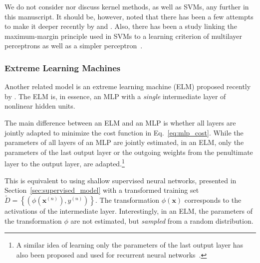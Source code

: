 \documentclass{now}
\newcommand{\vect}[1]{\mathbf{#1}}
\newcommand{\vx}[0]{\vect{x}}
\begin{document}

We do not consider nor discuss kernel methods, as well as SVMs, any further in
this manuscript.  It should be, however, noted that there has been a few
attempts to make it deeper recently by \citet{Cho2009} and \citet{Damianou2012}.
Also, there has been a study linking the maximum-margin principle used in SVMs
to a learning criterion of multilayer perceptrons as well as a simpler
perceptron~\citep[see, e.g.,][]{Collobert2004}.

\subsubsection{Extreme Learning Machines}
\label{sec:elm}

Another related model is an extreme learning machine
(ELM) proposed recently by
\citet{Huang2006}. The ELM is, in essence, an MLP with a \textit{single}
intermediate layer of nonlinear hidden units.

The main difference between an ELM and an MLP is whether all layers are jointly
adapted to minimize the cost function in Eq.~\eqref{eq:mlp_cost}. While the
parameters of all layers of an MLP are jointly estimated, in an ELM, only the
parameters of the last output layer or the outgoing weights from the penultimate
layer to the output layer, are adapted.\footnote{
    A similar idea of learning only the parameters of the last output layer has also
    been proposed and used for recurrent neural networks~\citep[see, e.g.,][]{Jaeger2009}.
}

This is equivalent to using shallow supervised neural networks, presented in
Section~\ref{sec:supervised_model} with a transformed training set
$\tilde{D}=\left\{ \left( \phi(\vx^{(n)}), y^{(n)} \right) \right\}$. The
transformation $\phi(\vx)$ corresponds to the activations of the intermediate
layer.  Interestingly, in an ELM, the parameters of the transformation $\phi$
are not estimated, but \textit{sampled} from a random distribution.
\end{document}
